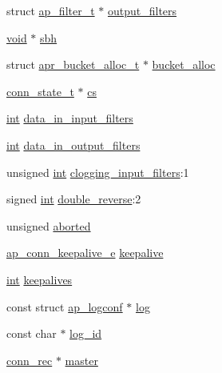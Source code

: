 \begin{DoxyCompactItemize}
\item 
struct \hyperlink{structap__filter__t}{ap\+\_\+filter\+\_\+t} $\ast$ \hyperlink{structconn__rec_a41ce808290656ac63a859b7145b0602c}{output\+\_\+filters}
\item 
\hyperlink{group__MOD__ISAPI_gacd6cdbf73df3d9eed42fa493d9b621a6}{void} $\ast$ \hyperlink{structconn__rec_af0e434bcb2a0a47c13e94069431fb281}{sbh}
\item 
struct \hyperlink{structapr__bucket__alloc__t}{apr\+\_\+bucket\+\_\+alloc\+\_\+t} $\ast$ \hyperlink{structconn__rec_a5a9ee4911c5a655131f76a04036fb4c0}{bucket\+\_\+alloc}
\item 
\hyperlink{structconn__state__t}{conn\+\_\+state\+\_\+t} $\ast$ \hyperlink{structconn__rec_a1cfa5dbd0193d91302d8ae0953bcbda1}{cs}
\item 
\hyperlink{pcre_8txt_a42dfa4ff673c82d8efe7144098fbc198}{int} \hyperlink{structconn__rec_adce1899d39e3d6ae4d08a3ff248e49e8}{data\+\_\+in\+\_\+input\+\_\+filters}
\item 
\hyperlink{pcre_8txt_a42dfa4ff673c82d8efe7144098fbc198}{int} \hyperlink{structconn__rec_a148edf3d5ae7140635f46d719aba83fd}{data\+\_\+in\+\_\+output\+\_\+filters}
\item 
unsigned \hyperlink{pcre_8txt_a42dfa4ff673c82d8efe7144098fbc198}{int} \hyperlink{structconn__rec_a005d7cb5ec440aa54aeb06330936c2af}{clogging\+\_\+input\+\_\+filters}\+:1
\item 
signed \hyperlink{pcre_8txt_a42dfa4ff673c82d8efe7144098fbc198}{int} \hyperlink{structconn__rec_a778097ac76492a50392c44609edb9acc}{double\+\_\+reverse}\+:2
\item 
unsigned \hyperlink{structconn__rec_aead9e56515e09e4f4b32a543e988e123}{aborted}
\item 
\hyperlink{group__APACHE__CORE__DAEMON_ga0fc39bb8f47f9c1f418f28354416db79}{ap\+\_\+conn\+\_\+keepalive\+\_\+e} \hyperlink{structconn__rec_a1e310dc6cfa709f96db50472a0d2382b}{keepalive}
\item 
\hyperlink{pcre_8txt_a42dfa4ff673c82d8efe7144098fbc198}{int} \hyperlink{structconn__rec_abe600faf0135f597e31dbdc226b6d622}{keepalives}
\item 
const struct \hyperlink{structap__logconf}{ap\+\_\+logconf} $\ast$ \hyperlink{structconn__rec_a0c921a26d4cef13e36814064603e4613}{log}
\item 
const char $\ast$ \hyperlink{structconn__rec_a8f009e9adfaeecd2b9faaf91b017cfae}{log\+\_\+id}
\item 
\hyperlink{structconn__rec}{conn\+\_\+rec} $\ast$ \hyperlink{structconn__rec_acc75f0de138c66d0dc80a59ea4a61094}{master}
\end{DoxyCompactItemize}


